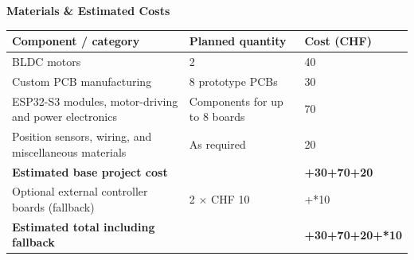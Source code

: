\documentclass[11pt,a4paper]{article}
\newcommand{\sectionlabel}[1]{%
  \par\vspace{12pt}%
  {\color{accent}\bfseries\fontsize{11.5}{14}\selectfont #1}%
  \par\vspace{4pt}%
}
\newcommand{\MotorCost}{40}
\newcommand{\PCBCost}{30}
\newcommand{\ElectronicsCost}{70}
\newcommand{\SensingCost}{20}
\newcommand{\FallbackUnitCost}{10}
\newcommand{\BaseCost}{\number\numexpr\MotorCost+\PCBCost+\ElectronicsCost+\SensingCost\relax}
\newcommand{\FallbackCost}{\number\numexpr2*\FallbackUnitCost\relax}
\newcommand{\TotalCost}{\number\numexpr\BaseCost+\FallbackCost\relax}
\begin{document}
\sectionlabel{Materials \& Estimated Costs}
{\fontsize{10.7}{13.5}\selectfont
\setlength{\tabcolsep}{5pt}
\renewcommand{\arraystretch}{1.34}
\begin{tabularx}{\linewidth}{@{}Y P{45mm} R{24mm}@{}}
\toprule
\textbf{Component / category} & \textbf{Planned quantity} & \textbf{Cost (CHF)}\\
\midrule
BLDC motors & 2 & \MotorCost\\
Custom PCB manufacturing & 8 prototype PCBs & \PCBCost\\
ESP32-S3 modules, motor-driving and power electronics & Components for up to 8 boards & \ElectronicsCost\\
Position sensors, wiring, and miscellaneous materials & As required & \SensingCost\\
\midrule
\textbf{Estimated base project cost} & & \textbf{\BaseCost}\\
Optional external controller boards (fallback) & 2 $\times$ CHF \FallbackUnitCost & +\FallbackCost\\
\midrule
\textbf{Estimated total including fallback} & & \textbf{\TotalCost}\\
\bottomrule
\end{tabularx}\par}
\end{document}
